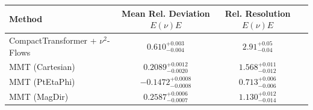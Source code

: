    \begin{tabular}{lccc}
        \toprule
        Method & Mean Rel. Deviation $E(\nu)E$ & Rel. Resolution $E(\nu)E$ \\
        \midrule
        CompactTransformer + $\nu^2$-Flows & $0.610^{+0.003}_{-0.004}$ & $2.91^{+0.05}_{-0.04}$ \\
        MMT (Cartesian) & $0.2089^{+0.0012}_{-0.0020}$ & $1.568^{+0.011}_{-0.012}$ \\
        MMT (PtEtaPhi) & $-0.1472^{+0.0008}_{-0.0008}$ & $0.713^{+0.006}_{-0.006}$ \\
        MMT (MagDir) & $0.2587^{+0.0006}_{-0.0007}$ & $1.130^{+0.012}_{-0.014}$ \\
        \bottomrule
    \end{tabular}
